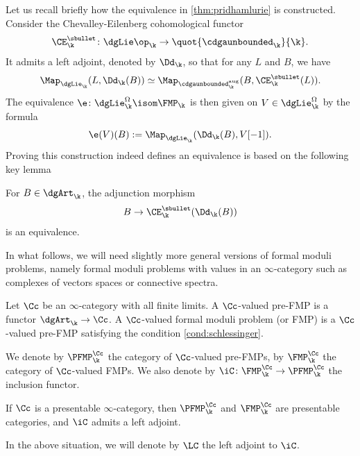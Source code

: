 Let us recall briefly how the equivalence in \autoref{thm:pridhamlurie} is constructed.
Consider the Chevalley-Eilenberg cohomological functor
\[
\CE^\sbullet_\k \colon \dgLie\op_\k \to \quot{\cdgaunbounded_\k}{\k}.
\]
It admits a left adjoint, denoted by $\Dd_\k$, so that for any $L$ and $B$, we have
\[
\Map_{\dgLie_\k}(L, \Dd_\k(B)) \simeq \Map_{\cdgaunbounded_\k^\mathrm{aug}}(B, \CE^\sbullet_\k(L)).
\]
The equivalence $\e \colon \dgLie_\k^\Omega \isom \FMP_\k$ is then given on $V \in \dgLie_\k^\Omega$ by the formula
\[
\e(V)(B) := \Map_{\dgLie_\k}(\Dd_\k(B), V[-1]).
\]
Proving this construction indeed defines an equivalence is based on the following key lemma
\begin{lem}\label{lem:BsimCDB}
For $B \in \dgArt_\k$, the adjunction morphism
\[
B \to \CE^\sbullet_\k(\Dd_\k(B))
\]
is an equivalence.
\end{lem}

In what follows, we will need slightly more general versions of formal moduli problems, namely formal moduli problems with values in an $\infty$-category such as complexes of vectors spaces or connective spectra.
\begin{df}\label{df:FMPC}
Let $\Cc$ be an $\infty$-category with all finite limits.
A $\Cc$-valued pre-FMP is a functor $\dgArt_\k \to \Cc$. A $\Cc$-valued formal moduli problem (or FMP) is a $\Cc$-valued pre-FMP satisfying the condition \eqref{cond:schlessinger}.

We denote by $\PFMP^\Cc_\k$ the category of $\Cc$-valued pre-FMPs, by $\FMP^\Cc_\k$ the category of $\Cc$-valued FMPs. We also denote by $\iC \colon \FMP^\Cc_\k \to \PFMP^\Cc_\k$ the inclusion functor.
\end{df}

\begin{lem}\label{lem:iCleftadjoint}
If $\Cc$ is a presentable $\infty$-category, then $\PFMP_\k^\Cc$ and $\FMP_\k^\Cc$ are presentable categories, and $\iC$ admits a left adjoint.
\end{lem}

\begin{df}
In the above situation, we will denote by $\LC$ the left adjoint to $\iC$.
\end{df}

